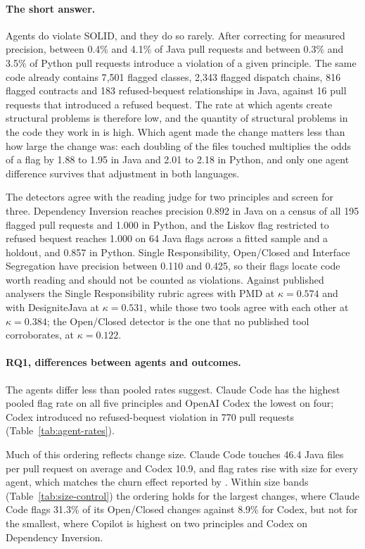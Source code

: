 \paragraph{The short answer.} Agents do violate SOLID, and they do so rarely. After correcting for
measured precision, between 0.4\% and 4.1\% of Java pull requests and between 0.3\% and 3.5\% of
Python pull requests introduce a violation of a given principle. The same code already contains
7{,}501 flagged classes, 2{,}343 flagged dispatch chains, 816 flagged contracts and 183
refused-bequest relationships in Java, against 16 pull requests that introduced a refused bequest.
The rate at which agents create structural problems is therefore low, and the quantity of structural
problems in the code they work in is high. Which agent made the change matters less than how large
the change was: each doubling of the files touched multiplies the odds of a flag by 1.88 to 1.95 in
Java and 2.01 to 2.18 in Python, and only one agent difference survives that adjustment in both
languages.

The detectors agree with the reading judge for two principles and screen for three. Dependency
Inversion reaches precision 0.892 in Java on a census of all 195 flagged pull requests and 1.000 in
Python, and the Liskov flag restricted to refused bequest reaches 1.000 on 64 Java flags across a
fitted sample and a holdout, and 0.857 in Python. Single Responsibility, Open/Closed and Interface
Segregation have precision between 0.110 and 0.425, so their flags locate code worth reading and
should not be counted as violations. Against published analysers the Single Responsibility rubric
agrees with PMD at $\kappa = 0.574$ and with DesigniteJava at $\kappa = 0.531$, while those two tools
agree with each other at $\kappa = 0.384$; the Open/Closed detector is the one that no published tool
corroborates, at $\kappa = 0.122$.

\paragraph{RQ1, differences between agents and outcomes.}
The agents differ less than pooled rates suggest. Claude Code has the highest pooled flag rate on all
five principles and OpenAI Codex the lowest on four; Codex introduced no refused-bequest violation
in 770 pull requests (Table~\ref{tab:agent-rates}).

Much of this ordering reflects change size. Claude Code touches 46.4 Java files per pull request on
average and Codex 10.9, and flag rates rise with size for every agent, which matches the churn effect
reported by \citet{cynthia2026postmerge}. Within size bands (Table~\ref{tab:size-control}) the
ordering holds for the largest changes, where Claude Code flags 31.3\% of its Open/Closed changes
against 8.9\% for Codex, but not for the smallest, where Copilot is highest on two principles and
Codex on Dependency Inversion.

